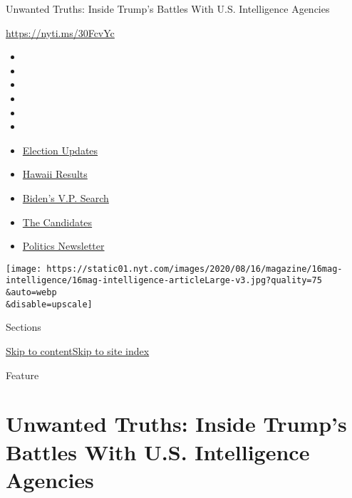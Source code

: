 Unwanted Truths: Inside Trump's Battles With U.S. Intelligence Agencies

\href{https://nyti.ms/30FcvYc}{https://nyti.ms/30FcvYc}

\begin{itemize}
\item
\item
\item
\item
\item
\item
\end{itemize}

\begin{itemize}
\item
  \href{https://www.nytimes.com/2020/08/07/us/elections/biden-vs-trump.html?action=click\&pgtype=Article\&state=default\&region=TOP_BANNER\&context=storylines_menu}{Election
  Updates}
\item
  \href{https://www.nytimes.com/interactive/2020/08/08/us/elections/results-hawaii-primary-elections.html?action=click\&pgtype=Article\&state=default\&region=TOP_BANNER\&context=storylines_menu}{Hawaii
  Results}
\item
  \href{https://www.nytimes.com/article/biden-vice-president-2020.html?action=click\&pgtype=Article\&state=default\&region=TOP_BANNER\&context=storylines_menu}{Biden's
  V.P. Search}
\item
  \href{https://www.nytimes.com/interactive/2019/us/politics/2020-presidential-candidates.html?action=click\&pgtype=Article\&state=default\&region=TOP_BANNER\&context=storylines_menu}{The
  Candidates}
\item
  \href{https://www.nytimes.com/newsletters/politics?action=click\&pgtype=Article\&state=default\&region=TOP_BANNER\&context=storylines_menu}{Politics
  Newsletter}
\end{itemize}

\texttt{[image: https://static01.nyt.com/images/2020/08/16/magazine/16mag-intelligence/16mag-intelligence-articleLarge-v3.jpg?quality=75\\\&auto=webp\\\&disable=upscale]}

Sections

\protect\hyperlink{site-content}{Skip to
content}\protect\hyperlink{site-index}{Skip to site index}

Feature

\hypertarget{unwanted-truths-inside-trumps-battles-with-us-intelligence-agencies}{%
\section{Unwanted Truths: Inside Trump's Battles With U.S. Intelligence
Agencies}\label{unwanted-truths-inside-trumps-battles-with-us-intelligence-agencies}}

